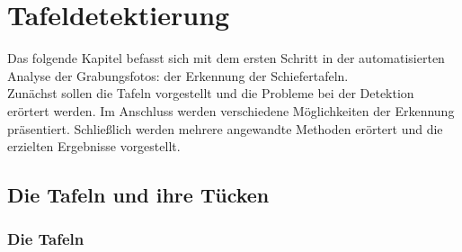\section{Tafeldetektierung}

Das folgende Kapitel befasst sich mit dem ersten Schritt in der automatisierten Analyse der Grabungsfotos: der Erkennung der Schiefertafeln.\\
Zunächst sollen die Tafeln vorgestellt und die Probleme bei der Detektion erörtert werden. Im Anschluss werden verschiedene Möglichkeiten der Erkennung präsentiert. Schließlich werden mehrere angewandte Methoden erörtert und die erzielten Ergebnisse vorgestellt.

\subsection{Die Tafeln und ihre Tücken}

\subsubsection{Die Tafeln}

